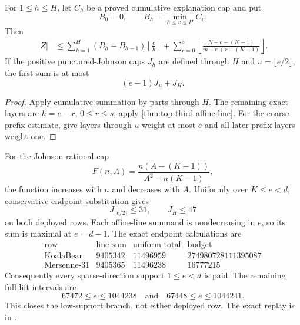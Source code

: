 \documentclass[11pt,a4paper]{amsart}
\numberwithin{equation}{section}
\theoremstyle{remark}
\begin{document}
\begin{corollary}
\label{cor:top-third-sparse-direction-profile}
For \(1\le h\le H\), let \(C_h\) be a proved cumulative explanation cap
and put
\[
 B_0=0,
 \qquad B_h=\min_{h\le v\le H}C_v.
\]
Then
\begin{align}
 |Z|
 &\le\sum_{h=1}^{H}(B_h-B_{h-1})
       \left\lfloor\frac eh\right\rfloor
   +\sum_{r=0}^{s}
       \left\lfloor\frac{N-e-(K-1)}{m-e+r-(K-1)}\right\rfloor.
 \label{eq:top-third-sparse-direction-profile}
\end{align}
If the positive punctured-Johnson caps \(J_h\) are defined through \(H\)
and \(u=\lfloor e/2\rfloor\), the first sum is at most
\[
 (e-1)J_u+J_H.
\]
\end{corollary}

\begin{proof}
Apply cumulative summation by parts through \(H\).  The remaining exact
layers are \(h=e-r\), \(0\le r\le s\); apply
\cref{thm:top-third-affine-line}.  For the coarse prefix estimate, give
layers through \(u\) weight at most \(e\) and all later prefix layers
weight one.
\end{proof}

\begin{remark}
For the Johnson rational cap
\[
 F(n,A)=\frac{n(A-(K-1))}{A^2-n(K-1)},
\]
the function increases with \(n\) and decreases with \(A\).  Uniformly over
\(K\le e<d\), conservative endpoint substitution gives
\[
 J_{\lfloor e/2\rfloor}\le31,
 \qquad J_H\le47
\]
on both deployed rows.  Each affine-line summand is nondecreasing in \(e\),
so its sum is maximal at \(e=d-1\).  The exact endpoint calculations are
\[
\begin{array}{c|r|r|r}
\text{row}&\text{line sum}&\text{uniform total}&\text{budget}\\ \hline
\text{KoalaBear}&9405342&11496959&274980728111395087\\
\text{Mersenne-31}&9405365&11496238&16777215
\end{array}
\]
Consequently every sparse-direction support \(1\le e<d\) is paid.  The
remaining full-lift intervals are
\[
 67472\le e\le1044238
 \quad\text{and}\quad
 67448\le e\le1044241.
\]
This closes the low-support branch, not either deployed row.  The exact
replay is in
.
\end{remark}
\end{document}
